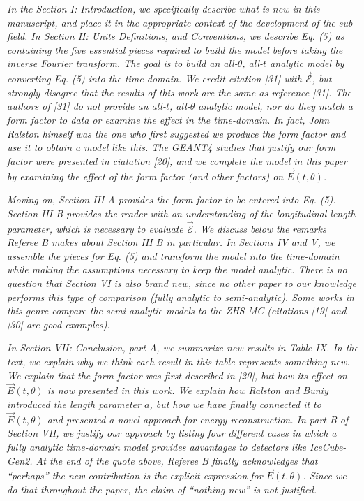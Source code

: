 \documentclass[12pt]{article}
\begin{document}
\textit{In the Section I: Introduction, we specifically describe what is new in this manuscript, and place it in the appropriate context of the development of the sub-field.  In Section II: Units Definitions, and Conventions, we describe Eq. (5) as containing the five essential pieces required to build the model before taking the inverse Fourier transform.  The goal is to build an all-$\theta$, all-$t$ analytic model by converting Eq. (5) into the time-domain.  We credit citation [31] with $\vec{\mathcal{E}}$, but strongly disagree that the results of this work are the same as reference [31].  The authors of [31] do not provide an all-$t$, all-$\theta$ analytic model, nor do they match a form factor to data or examine the effect in the time-domain.  In fact, John Ralston himself was the one who first suggested we produce the form factor and use it to obtain a model like this.  The GEANT4 studies that justify our form factor were presented in ciatation [20], and we complete the model in this paper by examining the effect of the form factor (and other factors) on $\vec{E}(t,\theta)$.}

\textit{Moving on, Section III A provides the form factor to be entered into Eq. (5).  Section III B provides the reader with an understanding of the longitudinal length parameter, which is necessary to evaluate $\vec{\mathcal{E}}$.  We discuss below the remarks Referee B makes about Section III B in particular.  In Sections IV and V, we assemble the pieces for Eq. (5) and transform the model into the time-domain while making the assumptions necessary to keep the model analytic.  There is no question that Section VI is also brand new, since no other paper to our knowledge performs this type of comparison (fully analytic to semi-analytic).  Some works in this genre compare the semi-analytic models to the ZHS MC (citations [19] and [30] are good examples).}

\textit{In Section VII: Conclusion, part A, we summarize new results in Table IX.  In the text, we explain why we think each result in this table represents something new.  We explain that the form factor was first described in [20], but how its effect on $\vec{E}(t,\theta)$ is now presented in this work.  We explain how Ralston and Buniy introduced the length parameter $a$, but how we have finally connected it to $\vec{E}(t,\theta)$ and presented a novel approach for energy reconstruction.  In part B of Section VII, we justify our approach by listing four different cases in which a fully analytic time-domain model provides advantages to detectors like IceCube-Gen2.  At the end of the quote above, Referee B finally acknowledges that ``perhaps'' the new contribution is the explicit expression for $\vec{E}(t,\theta)$.  Since we do that throughout the paper, the claim of ``nothing new'' is not justified.}
\end{document}
